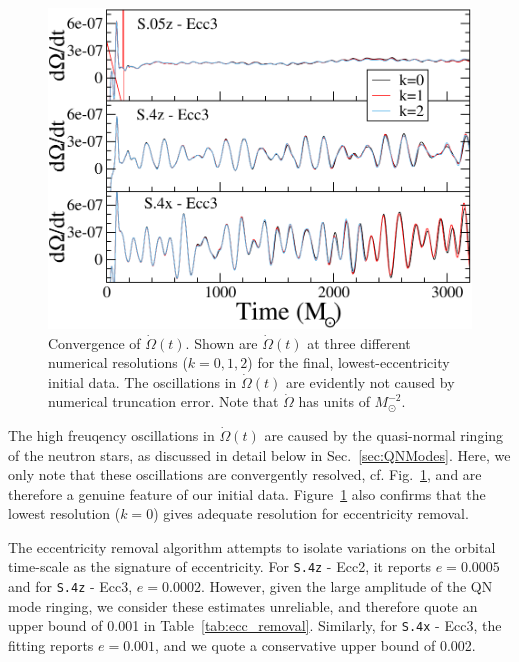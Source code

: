 {%
\begin{figure}
  \includegraphics[width=0.92\columnwidth]{chap2/OmegaDotComparison}
  \caption[Convergence of the derivative of the binary orbital frequency.]{ {\label{fig:OmegaDotComparison}Convergence of
      $\dot\Omega(t)$.  Shown are $\dot\Omega(t)$ at three different
      numerical resolutions ($k=0,1,2$) for the final,
      lowest-eccentricity initial data.  The oscillations in
      $\dot\Omega(t)$ are evidently not caused by numerical truncation
      error. Note that $\dot{\Omega}$ has units of $M_{\odot}^{-2}$.}}
\end{figure}

The high freuqency oscillations in $\dot\Omega(t)$ are caused by the
quasi-normal ringing of the neutron stars, as discussed in detail
below in Sec.~\ref{sec:QNModes}.  Here, we only note that these
oscillations are convergently resolved,
cf. Fig.~\ref{fig:OmegaDotComparison}, and are therefore a genuine
feature of our initial data.  Figure~\ref{fig:OmegaDotComparison} also
confirms that the lowest resolution ($k=0$) gives adequate resolution
for eccentricity removal.

The eccentricity removal algorithm attempts to isolate variations on
the orbital time-scale as the signature of eccentricity. For
{\tt S.4z} - Ecc2, it reports $e=0.0005$ and for {\tt S.4z} - Ecc3, $e=0.0002$.
However, given the large amplitude of the QN mode ringing, we consider
these estimates unreliable, and therefore quote an upper bound of
0.001 in Table~\ref{tab:ecc_removal}. Similarly, for {\tt S.4x} - Ecc3, the fitting
reports $e=0.001$, and we quote a conservative upper bound of 0.002.

}
